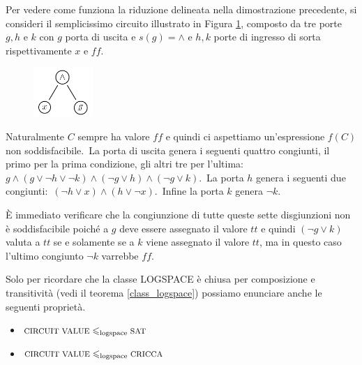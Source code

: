 \begin{example}

    Per vedere come funziona la riduzione delineata nella dimostrazione precedente, si consideri il semplicissimo circuito illustrato in Figura \ref{fig:circuitEx}, composto da tre porte $g,h$ e $k$ con $g$ porta di uscita e $s(g) = \land$ e $h,k$ porte di ingresso di sorta rispettivamente $x$ e $\mathit{ff}$.\

    \begin{figure}[H]
        \centering
        \includegraphics[width=0.2\textwidth]{images/CircuitoExample.png}
        \caption{}
        \label{fig:circuitEx}
    \end{figure}

    \noindent Naturalmente $C$ sempre ha valore $\mathit{ff}$ e quindi ci aspettiamo un'espressione $f(C)$ non soddisfacibile.\
    La porta di uscita genera i seguenti quattro congiunti, il primo per la prima condizione, gli altri tre per l'ultima:\ $g \land (g \lor \neg h \lor \neg k) \land (\neg g \lor h) \land (\neg g \lor k)$.\
    La porta $h$ genera i seguenti due congiunti:\ $(\neg h \lor x) \land (h \lor \neg x)$.\
    Infine la porta $k$ genera $\neg k$.\

    È immediato verificare che la congiunzione di tutte queste sette disgiunzioni non è soddisfacibile poiché a $g$ deve essere assegnato il valore $\mathit{tt}$ e quindi $(\neg g \lor k)$ valuta a $\mathit{tt}$ se e solamente se a $k$ viene assegnato il valore $\mathit{tt}$, ma in questo caso l'ultimo congiunto $\neg k$ varrebbe $\mathit{ff}$.
\end{example}

\noindent Solo per ricordare che la classe LOGSPACE è chiusa per composizione e transitività (vedi il teorema \ref{class_logspace}) possiamo enunciare anche le seguenti proprietà.

\begin{corollario}
    \hfill
    \begin{itemize}
        \itemsep0px
        \item[] $\mbox{\footnotesize CIRCUIT VALUE} \leqslant_{\mathrm{logspace}} \mbox{\footnotesize SAT}$
        \item[] $\mbox{\footnotesize CIRCUIT VALUE} \leqslant_{\mathrm{logspace}} \mbox{\footnotesize CRICCA}$
    \end{itemize}
\end{corollario}

